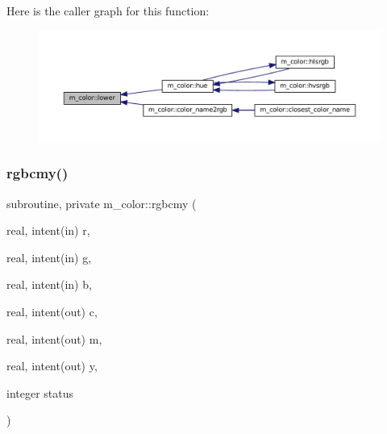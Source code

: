 Here is the caller graph for this function\+:\nopagebreak
\begin{figure}[H]
\begin{center}
\leavevmode
\includegraphics[width=350pt]{namespacem__color_a704e93b42d777a827ec557c92d2dd7dc_icgraph}
\end{center}
\end{figure}
\mbox{\label{namespacem__color_ad6e8505eef5add299c4475d289f3c5c5}} 
\subsubsection{\texorpdfstring{rgbcmy()}{rgbcmy()}}
{\footnotesize\ttfamily subroutine, private m\+\_\+color\+::rgbcmy (\begin{DoxyParamCaption}\item[{real, intent(in)}]{r,  }\item[{real, intent(in)}]{g,  }\item[{real, intent(in)}]{b,  }\item[{real, intent(out)}]{c,  }\item[{real, intent(out)}]{m,  }\item[{real, intent(out)}]{y,  }\item[{integer}]{status }\end{DoxyParamCaption})\hspace{0.3cm}{\ttfamily [private]}}



